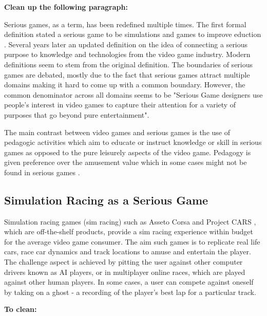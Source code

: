 \documentclass{article}
\begin{document}
\textbf {Clean up the following paragraph:}

Serious games, as a term, has been redefined multiple times. The first formal definition stated a serious game to be simulations and games to improve eduction \cite{abt1970}. Several years later an updated definition on the idea of connecting a serious purpose to knowledge and technologies from the video game industry\cite{michael2005serious}. Modern definitions seem to stem from the original definition\cite{michael2005serious}\cite{zyda2005visual}. The boundaries of serious games are debated, mostly due to the fact that serious games attract multiple domains making it hard to come up with a common boundary. However, the common denominator across all domains seems to be "Serious Game designers use people's interest in video games to capture their attention for a variety of purposes that go beyond pure entertainment"\cite{djaouti2011classifying}.

The main contrast between video games and serious games is the use of pedagogic activities which aim to educate or instruct knowledge or skill \cite{zyda2005visual} in serious games as opposed to the pure leisurely aspects of the video game. Pedagogy is given preference over the amusement value which in some cases might not be found in serious games \cite{zyda2005visual}.

\subsection{Simulation Racing as a Serious Game}

Simulation racing games (sim racing) such as Asseto Corsa \cite{aqqalla1} and Project CARS \cite{aqqalla2}, which are off-the-shelf products, provide a sim racing experience within budget for the average video game consumer. The aim such games is to replicate real life cars, race car dynamics and track locations to amuse and entertain the player. The challenge aspect is achieved by pitting the user against other computer drivers known as AI players, or in multiplayer online races, which are played against other human players. In some cases, a user can compete against oneself by taking on a ghost - a recording of the player's best lap for a particular track. 

\textbf{To clean:}
\end{document}
